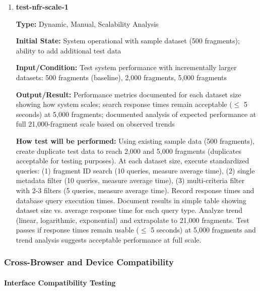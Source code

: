 \documentclass[12pt, titlepage]{article}
\begin{document}
\begin{enumerate}

\item \textbf{test-nfr-scale-1}

\textbf{Type:} Dynamic, Manual, Scalability Analysis

\textbf{Initial State:} System operational with sample dataset (500 fragments); ability to add additional test data

\textbf{Input/Condition:} Test system performance with incrementally larger datasets: 500 fragments (baseline), 2,000 fragments, 5,000 fragments

\textbf{Output/Result:} Performance metrics documented for each dataset size showing how system scales; search response times remain acceptable ($\leq$ 5 seconds) at 5,000 fragments; documented analysis of expected performance at full 21,000-fragment scale based on observed trends

\textbf{How test will be performed:} Using existing sample data (500 fragments), create duplicate test data to reach 2,000 and 5,000 fragments (duplicates acceptable for testing purposes). At each dataset size, execute standardized queries: (1) fragment ID search (10 queries, measure average time), (2) single metadata filter (10 queries, measure average time), (3) multi-criteria filter with 2-3 filters (5 queries, measure average time). Record response times and database query execution times. Document results in simple table showing dataset size vs. average response time for each query type. Analyze trend (linear, logarithmic, exponential) and extrapolate to 21,000 fragments. Test passes if response times remain usable ($\leq$ 5 seconds) at 5,000 fragments and trend analysis suggests acceptable performance at full scale.

\end{enumerate}

\subsubsection{Cross-Browser and Device Compatibility}

\paragraph{Interface Compatibility Testing}
\end{document}
